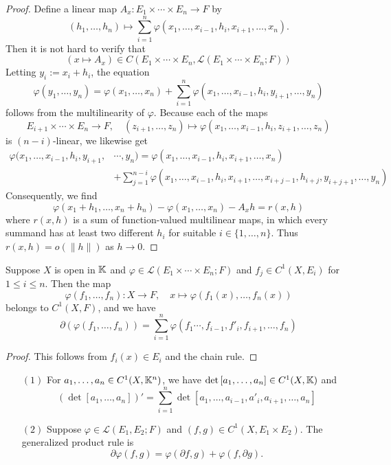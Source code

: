\begin{proof}
Define a linear map $A_x:E_1\times\cdots\times E_n\to F$ by
\[(h_1,\dots,h_n)\mapsto \sum_{i=1}^{n}\varphi(x_1,\dots,x_{i-1},h_i,x_{i+1},\dots,x_n).\]
Then it is not hard to verify that
\[(x\mapsto A_x)\in C(E_1\times\cdots\times E_n,\mathcal{L}(E_1\times\cdots\times E_n;F))\]
Letting $y_i:=x_i+h_i$, the equation
\[\varphi(y_1,\dots,y_n)=\varphi(x_1,\dots,x_n)+\sum_{i=1}^{n}\varphi(x_1,\dots,x_{i-1},h_i,y_{i+1},\dots,y_n)\]
follows from the multilinearity of $\varphi$. Because each of the maps
\[E_{i+1}\times\cdots\times E_n\to F,\quad (z_{i+1},\dots,z_n)\mapsto \varphi(x_1,\dots,x_{i-1},h_i,z_{i+1},\dots,z_n)\]
is $(n-i)$-linear, we likewise get
\begin{align*}
\varphi(x_1,\dots,x_{i-1},h_i,y_{i+1},&\cdots,y_n)=\varphi(x_1,\dots,x_{i-1},h_i,x_{i+1},\dots,x_n)\\
&+\sum_{j=1}^{n-i}\varphi(x_1,\dots,x_{i-1},h_i,x_{i+1},\dots,x_{i+j-1},h_{i+j},y_{i+j+1},\dots,y_n)
\end{align*}
Consequently, we find
\[\varphi(x_1+h_1,\dots,x_n+h_n)-\varphi(x_1,\dots,x_n)-A_xh=r(x,h)\]
where $r(x,h)$ is a sum of function-valued multilinear maps, in which every summand has at least two different $h_i$ for suitable $i\in\{1,\dots,n\}$. Thus $r(x,h)=o(\|h\|)$ as $h\to 0$.
\end{proof}
\begin{corollary}
Suppose $X$ is open in $\mathbb{K}$ and $\varphi\in\mathcal{L}(E_1\times\cdots\times E_n;F)$ and $f_j\in C^1(X,E_i)$ for $1\leq i\leq n$. Then the map
\[\varphi(f_1,\dots,f_n):X\to F,\quad x\mapsto \varphi(f_1(x),\dots,f_n(x))\]
belongs to $C^1(X,F)$, and we have
\[\partial(\varphi(f_1,\dots,f_n))=\sum_{i=1}^{n}\varphi(f_1\cdots,f_{i-1},f'_i,f_{i+1},\dots,f_n)\]
\end{corollary}
\begin{proof}
This follows from $f_i(x)\in E_i$ and the chain rule.
\end{proof}
\begin{proposition}
\mbox{}
\begin{itemize}
\item[$(1)$] For $a_1,\dots,a_n\in C^1(X,\mathbb{K}^n)$, we have $\mathrm{det}\,[a_1,\dots,a_n]\in C^1(X,\mathbb{K})$ and \[(\det[a_1,\dots,a_n])'=\sum_{i=1}^{n}\det[a_1,\dots,a_{i-1},a'_i,a_{i+1},\dots,a_n]\]
\item[$(2)$] Suppose $\varphi\in\mathcal{L}(E_1,E_2;F)$ and $(f,g)\in C^1(X,E_1\times E_2)$. The generalized product rule is 
\[\partial \varphi(f,g)=\varphi(\partial f,g)+\varphi(f,\partial g).\]
\end{itemize}
\end{proposition}
